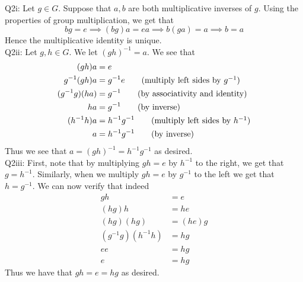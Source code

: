 \documentclass[letterpaper]{article}
\begin{document}
\noindent
Q2i: Let $g\in G$. Suppose that $a,b$ are both multiplicative inverses of $g$. Using the properties of group multiplication, we get that 
$$bg = e \implies (bg)a = ea \implies b(ga) = a \implies b=a$$
Hence the multiplicative identity is unique. 
\newline \\ 
Q2ii: Let $g,h\in G$. We let $(gh)^{-1}=a$. We see that 
\begin{align*}
    (gh)a &= e
    \\ g^{-1}(gh)a &= g^{-1}e \tag{multiply left sides by $g^{-1}$}
    \\ (g^{-1}g)(ha) &= g^{-1} \tag{by associativity and identity}
    \\ ha &= g^{-1} \tag{by inverse}
    \\ (h^{-1} h) a &=h^{-1} g^{-1} \tag{multiply left sides by $h^{-1}$}
    \\ a &=h^{-1}g^{-1} \tag{by inverse}
\end{align*}
Thus we see that $a=(gh)^{-1} = h^{-1}g^{-1}$ as desired. 
\newline \\ 
Q2iii: First, note that by multiplying $gh =e$ by $h^{-1}$ to the right, we get that $g = h^{-1}$. Similarly, when we multiply $gh = e$ by $g^{-1}$ to the left we get that $h = g^{-1}$. We can now verify that indeed
\begin{align*}
    gh & = e
    \\ (hg)h &= he \tag{multiply both sides by $h$}
    \\ (hg)(hg)&= (he)g \tag{numtiply both sides by g, associativity}
    \\ (g^{-1}g)(h^{-1}h) & =hg 
    \\ ee& =hg \tag{by inverse}
    \\ e&=hg \tag{by identity}
\end{align*} Thus we have that $gh = e = hg$ as desired. 
\end{document}
